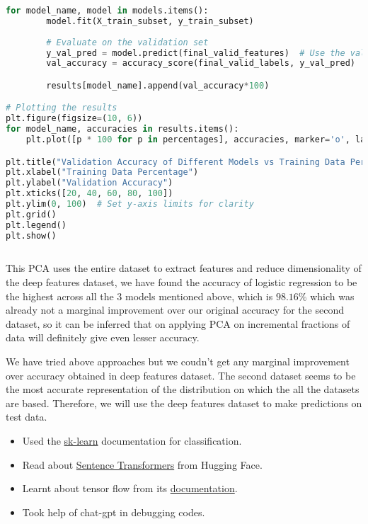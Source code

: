 \documentclass{article} %
\begin{document}
\begin{lstlisting}[language=Python]
    for model_name, model in models.items():
        model.fit(X_train_subset, y_train_subset)
        
        # Evaluate on the validation set
        y_val_pred = model.predict(final_valid_features)  # Use the validation features
        val_accuracy = accuracy_score(final_valid_labels, y_val_pred)

        results[model_name].append(val_accuracy*100)

# Plotting the results
plt.figure(figsize=(10, 6))
for model_name, accuracies in results.items():
    plt.plot([p * 100 for p in percentages], accuracies, marker='o', label=model_name)

plt.title("Validation Accuracy of Different Models vs Training Data Percentage")
plt.xlabel("Training Data Percentage")
plt.ylabel("Validation Accuracy")
plt.xticks([20, 40, 60, 80, 100])
plt.ylim(0, 100)  # Set y-axis limits for clarity
plt.grid()
plt.legend()
plt.show()
    
\end{lstlisting}
This PCA uses the entire dataset to extract features and reduce dimensionality of the deep features dataset, we have found the accuracy of logistic regression to be the highest across all the $3$ models mentioned above, which is $98.16\%$ which was already not a marginal improvement over our original accuracy for the second dataset, so it can be inferred that on applying PCA on incremental fractions of data will definitely give even lesser accuracy.







We have tried above approaches but we coudn't get any marginal improvement over accuracy obtained in deep features dataset. The second dataset seems to be the most accurate representation of the distribution on which the all the datasets are based. Therefore, we will use the deep features dataset to make predictions on test data.



\begin{itemize}
    \item Used the \href{https://scikit-learn.org/stable/supervised_learning.html}{sk-learn} documentation for classification.
    \item Read about \href{https://huggingface.co/models?library=sentence-transformers&sort=downloads}{Sentence Transformers} from Hugging Face.
    \item Learnt about tensor flow from its \href{https://www.tensorflow.org/tutorials}{documentation}.
    \item Took help of chat-gpt in debugging codes. 
\end{itemize}
\end{document}
